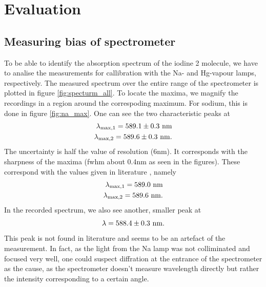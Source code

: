\section{Evaluation}

\subsection{Measuring bias of spectrometer}
To be able to identify the absorption spectrum of the iodine 2 molecule, we have to analise 
the measurements for callibration with the Na- and Hg-vapour lamps, respectively. The measured
spectrum over the entire range of the spectrometer is plotted in figure \ref{fig:specturm_all}. 
To locate the maxima, we magnify the recordings in a region around the correspoding maximum. 
For sodium, this is done in figure \ref{fig:na_max}. One can see the two characteristic peaks 
at 
\begin{eqnarray*}
    \lambda_\mathrm{max, 1} = 589.1 \pm 0.3 \ \mathrm{nm} \\
    \lambda_\mathrm{max, 2} = 589.6 \pm 0.3 \ \mathrm{nm}.
\end{eqnarray*}
The uncertainty is half the value of 
resolution (6nm). It corresponds with the sharpness of the maxima 
(fwhm about 0.4nm as seen in the figures). 
These correspond with the values given in literature \cite{nist}, namely 
\begin{eqnarray*}
    \lambda_\mathrm{max, 1} = 589.0 \ \mathrm{nm} \\
    \lambda_\mathrm{max, 2} = 589.6 \ \mathrm{nm}.
\end{eqnarray*}
In the recorded spectrum, we also see another, smaller peak at 
\begin{equation}
    \lambda = 588.4 \pm 0.3 \ \mathrm{nm}.
\end{equation} 
This peak is not found in literature \cite{nist} and seems to be an artefact of the measurement. 
In fact, as the light from the Na lamp was not colliminated and focused very well, one could 
suspect diffration at the entrance of the spectrometer as the cause, as the spectrometer 
doesn't measure wavelength directly but rather the intensity corresponding to a certain angle. 

